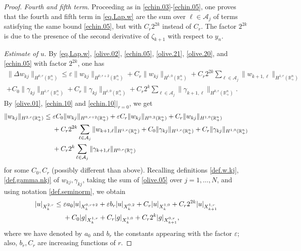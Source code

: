 \documentclass[10pt,a4paper]{amsart}
\newcommand{\R}{{\mathbb R}}
\newcommand{\e}{\varepsilon}
\newcommand{\mA}{\mathcal{A}}
\begin{document}
\begin{proof}
\emph{Fourth and fifth term}. 
Proceeding as in \eqref{echin.03}-\eqref{echin.05}, one proves that the 
fourth and fifth term in \eqref{eq.Lap.w} are the sum over $\ell \in \mA_j$ of terms 
satisfying the same bound \eqref{echin.05}, but with $C_r 2^{2k}$ instead of $C_r$. 
The factor $2^{2k}$ is due to the presence of the second derivative of $\zeta_{k+1}$ 
with respect to $y_n$. 
 

\emph{Estimate of $u$}. 
By \eqref{eq.Lap.w}, \eqref{olive.02}, \eqref{echin.05}, \eqref{olive.21}, \eqref{olive.20}, 
and \eqref{echin.05} with factor $2^{2k}$, one has 
\begin{multline}
\| \Delta w_{kj} \|_{H^{0,r}(\R^n_+)}
\leq 
\e \| w_{kj} \|_{H^{0, r+2}(\R^n_+)}
+ C_r \| w_{kj} \|_{H^{1,0}(\R^n_+)}
+ C_r 2^{2k} \sum_{\ell \in \mA_j} \| w_{k+1, \ell} \|_{H^{1,r}(\R^n_+)}
\\
+ C_0 \| \gamma_{kj} \|_{H^{1,r}(\R^n_+)} 
+ C_r \| \gamma_{kj} \|_{H^{1,0}(\R^n_+)} 
+ C_r 2^k \sum_{\ell \in \mA_j} \| \gamma_{k+1,\ell} \|_{H^{0,r}(\R^n_+)}.
\label{echin.10}
\end{multline}
By \eqref{olive.01}, \eqref{echin.10} and \eqref{echin.10}$|_{r=0}$, we get
\begin{align}
\| w_{kj} \|_{H^{2,r}(\R^n_+)}
& \leq 
\e C_0 \| w_{kj} \|_{H^{0, r+2}(\R^n_+)} 
+ \e C_r \| w_{kj} \|_{H^{0, 2}(\R^n_+)}
+ C_r \| w_{kj} \|_{H^{1,0}(\R^n_+)}
\notag \\ & \quad \ 
+ C_r 2^{2k} \sum_{\ell \in \mA_j} \| w_{k+1, \ell} \|_{H^{1,r}(\R^n_+)}
+ C_0 \| \gamma_{kj} \|_{H^{1,r}(\R^n_+)} 
+ C_r \| \gamma_{kj} \|_{H^{1,0}(\R^n_+)} 
\notag \\ & \quad \ 
+ C_r 2^k \sum_{\ell \in \mA_j} \| \gamma_{k+1,\ell} \|_{H^{0,r}(\R^n_+)}
\label{olive.05}
\end{align}
for some $C_0, C_r$ (possibly different than above).
Recalling definitions \eqref{def.w.kj}, \eqref{def.gamma.nkj} of $w_{kj}, \gamma_{kj}$,  
taking the sum of \eqref{olive.05} over $j = 1, \ldots, N$, 
and using notation \eqref{def.seminorm}, 
we obtain 
\begin{align}
|u|_{X^{2,r}_k}
& \leq \e a_0 |u|_{X^{0,r+2}_k}
+ \e b_r |u|_{X^{0,2}_k}
+ C_r |u|_{X^{1,0}_k}
+ C_r 2^{2k} |u|_{X^{1,r}_{k+1}}
\notag \\ & \quad \ 
+ C_0 |g|_{X^{1,r}_k}
+ C_r |g|_{X^{1,0}_k}
+ C_r 2^k |g|_{X^{0,r}_{k+1}},
\label{olive.09}
\end{align}
where we have denoted by $a_0$ and $b_r$ the constants appearing with the factor $\e$;
also, $b_r, C_r$ are increasing functions of $r$. 

\end{proof}
\end{document}
